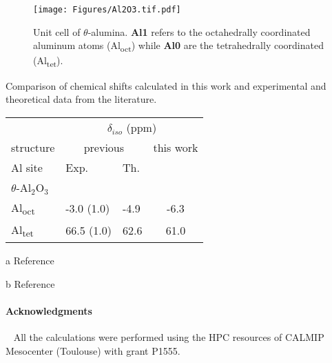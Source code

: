 \documentclass[final,3p,times,twocolumn]{elsarticle}
\begin{document}
\begin{small}
\begin{figure}[!htbp]
  \centering
  \texttt{[image: Figures/Al2O3.tif.pdf]}
  \caption{Unit cell of \(\theta\)-alumina. \textbf{Al1} refers to the octahedrally coordinated aluminum atoms (Al\textsubscript{oct}) while \textbf{Al0} are the tetrahedrally coordinated (Al\textsubscript{tet}). }
  \label{fig:etichetta}
\end{figure}
\begin{table*}
\end{table*}
\begin{threeparttable}
\caption{Comparison of chemical shifts calculated in this work and experimental and theoretical data from the literature.}
\setlength{\tabcolsep}{10pt} %
\begin{tabular}{lllll}
\hline\hline
            & \multicolumn{4}{c}{\(\delta_{iso}\) (\(\mathrm{ppm}\))}                           \\ \cline{2-5} 
structure   & \multicolumn{2}{c}{previous} & \multicolumn{2}{c}{this work} \\ \cline{2-3}
Al site     & Exp.             & Th.       & \multicolumn{2}{l}{}          \\ \hline
\(\theta\)-Al\(_2\)O\(_3\) & \multicolumn{4}{c}{}                                         \\
Al\textsubscript{oct}       & -3.0 (1.0)\tnote{a}       & -4.9\tnote{b}      & \multicolumn{2}{c}{-6.3}      \\
Al\textsubscript{tet}       & 66.5 (1.0)\tnote{a}      & 62.6\tnote{b}     & \multicolumn{2}{c}{61.0}      \\ \hline\hline
\end{tabular}
\begin{tablenotes}
\item[a] Reference \cite{ODELL2007169}
\item[b] Reference \cite{PhysRevB.84.235119}
\end{tablenotes}
\label{tab:my-table}
\end{threeparttable}

\vskip 0.5cm
\paragraph{\textbf{Acknowledgments}} \ 
\vskip 0.5cm
\noindent
All the calculations were performed using the HPC resources of CALMIP Mesocenter (Toulouse) with grant P1555.
\vskip 0.5cm
\noindent

\vskip 0.5cm

\end{small}
\end{document}
